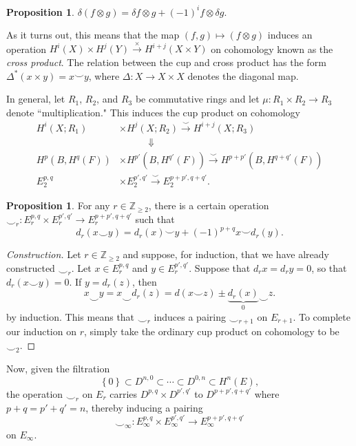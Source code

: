 \documentclass[10pt,letterpaper,cm]{nupset}
\theoremstyle{definition}
\theoremstyle{theorem}
\newtheorem{prop}[defn]{Proposition}
\theoremstyle{remark}
\newcommand{\Z}{\mathbb Z}
\newcommand{\1}{\mathbb{1}}
\newcommand{\0}{\vec 0}
\begin{document}
\begin{prop}
$\delta(f \otimes g) = \delta{f} \otimes g + (-1)^i{f} \otimes \delta{g}$.
\end{prop}

As it turns out, this means that the map $\left(f,g\right) \mapsto \left(f \otimes g\right)$ induces an operation $H^i(X) \times H^j(Y) \overset{\times}{\longrightarrow} H^{i+j}(X\times Y)$ on cohomology known as the \textit{cross product}. The relation between the cup and cross product has the form $\Delta^{\ast}(x\times y) = x\smile y$, where $\Delta : X \to X \times X$ denotes the diagonal map.

\medskip

In general, let $R_1$, $R_2$, and $R_3$ be commutative rings and let $\mu : R_1 \times R_2 \to R_3$ denote  ``multiplication." This induces the cup product on cohomology
\begin{align*}
H^i(X; R_1)&  \times H^j(X; R_2)  \overset{\smile}{\longrightarrow} H^{i+j}(X; R_3)
\\ & \quad\quad\quad  \Downarrow
\\ H^p(B, H^q(F))& \times H^{p'}(B, H^{q'}(F)) \overset{\smile}{\longrightarrow} H^{p+p'}(B, H^{q+q'}(F))
\\ E_2^{p,q}& \times E_2^{p', q'}  \overset{\smile}{\longrightarrow} E_2^{p+p', q+q'}. 
\end{align*}

\begin{prop}
For any $r\in \Z_{\geq 2}$, there is a certain operation $\smile_r : E_r^{p,q} \times E_r^{p',q'} \to E_r^{p+p', q+q'}$ such that
\[
d_r(x\smile y) = d_r(x) \smile y + ({-1})^{p+q}x \smile d_r(y).
\] 
\end{prop}
\begin{proof}[Construction]
Let $r\in \Z_{\geq 2}$ and  suppose, for induction, that we have already constructed $\smile_r$. Let $x \in E_r^{p,q}$ and $y\in E_r^{p',q'}$. Suppose that $d_r{x} =d_r{y} =0$, so that $d_r(x \smile y) =0$. If $y = d_r(z)$, then 
\[
x \smile y = x \smile d_r(z) = d(x\smile z) \pm \underbrace{d_r(x)}_{0} \smile z.
\] by induction. This means that $\smile_r$ induces a pairing $\smile_{r+1}$ on $E_{r+1}$. To complete our induction on $r$, simply  take the ordinary cup product on cohomology to be $\smile_2$.
\end{proof}

Now, given the filtration
\[
\left\{0\right\} \subset D^{n,0} \subset \cdots \subset D^{0,n} \subset H^n(E),
\] the operation $\smile_r$ on $E_r$ carries $D^{p,q} \times D^{p',q'}$ to $D^{p+p', q+q'}$ where $p+q = p'+q' =n$, thereby inducing a pairing $$\smile_{\infty}: E_{\infty}^{p,q} \times E_{\infty}^{p',q'} \to E_{\infty}^{p+p', q+q'}$$
on $E_{\infty}$.
\end{document}
